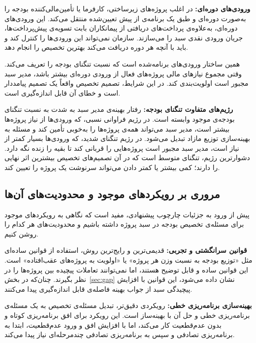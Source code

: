 \textbf{ورودی‌های دوره‌ای:} در اغلب پروژه‌های زیرساختی، کارفرما یا
تأمین‌مالی‌کننده بودجه را به‌صورت دوره‌ای و طبق یک برنامه‌ی از پیش
تعیین‌شده منتقل می‌کند. این ورودی‌های دوره‌ای، به‌علاوه‌ی پرداخت‌های
دریافتی از پیمانکاران بابت تسویه‌ی پیش‌پرداخت‌ها، جریان ورودی
نقدی سبد را می‌سازند. سازمان نمی‌تواند این ورودی‌ها را کنترل کند
و باید با آنچه هر دوره دریافت می‌کند بهترین تخصیص را انجام دهد.

همین ساختار ورودی‌های برنامه‌شده است که نسبت تنگنای بودجه را
تعریف می‌کند. وقتی مجموع نیازهای مالی پروژه‌های فعال از ورودی
دوره‌ای بیشتر باشد، مدیر سبد مجبور است اولویت‌بندی کند. در این
شرایط، تصمیم تخصیص واقعاً یک تصمیم پیامددار است و خطای آن
قابل اندازه‌گیری است.

\textbf{رژیم‌های متفاوت تنگنای بودجه:} رفتار بهینه‌ی مدیر سبد
به شدت به نسبت تنگنای بودجه‌ی موجود وابسته است. در رژیم
فراوانی نسبی، که ورودی‌ها از نیاز پروژه‌ها بیشتر است، مدیر
سبد می‌تواند همه‌ی پروژه‌ها را به‌خوبی تأمین کند و مسئله به
بهینه‌سازی توزیع مازاد تبدیل می‌شود. در رژیم تنگنای شدید،
که ورودی‌ها بسیار کمتر از نیاز است، مدیر سبد مجبور است
پروژه‌هایی را قربانی کند تا بقیه را زنده نگه دارد. دشوارترین
رژیم، تنگنای متوسط است که در آن تصمیم‌های تخصیص بیشترین اثر
نهایی را دارند؛ کمی بیشتر یا کمتر دادن می‌تواند سرنوشت یک
پروژه را تعیین کند.

\subsection{مروری بر رویکردهای موجود و محدودیت‌های آن‌ها}
\label{subsec:existing_approaches}

پیش از ورود به جزئیات چارچوب پیشنهادی، مفید است که نگاهی به
رویکردهای موجود برای مسئله‌ی تخصیص بودجه در سبد پروژه داشته باشیم
و محدودیت‌های هر کدام را روشن کنیم.

\textbf{قوانین سرانگشتی و تجربی:} قدیمی‌ترین و رایج‌ترین روش، استفاده
از قوانین ساده‌ای مثل «توزیع بودجه به نسبت وزن هر پروژه» یا
«اولویت به پروژه‌های عقب‌افتاده» است. این قوانین ساده و قابل
توضیح هستند، اما نمی‌توانند تعاملات پیچیده بین پروژه‌ها را
در نظر بگیرند. چنان‌که در بخش~\ref{sec:gap} نشان داده می‌شود،
این قوانین با افزایش پیچیدگی سبد از جواب بهینه فاصله‌ی
قابل اندازه‌گیری پیدا می‌کنند.

\textbf{بهینه‌سازی برنامه‌ریزی خطی:} رویکردی دقیق‌تر، تبدیل مسئله‌ی
تخصیص به یک مسئله‌ی برنامه‌ریزی خطی و حل آن با بهینه‌ساز است.
این رویکرد برای افق برنامه‌ریزی کوتاه و بدون عدم‌قطعیت کار
می‌کند، اما با افزایش افق و ورود عدم‌قطعیت، ابتدا به برنامه‌ریزی
تصادفی و سپس به برنامه‌ریزی تصادفی چندمرحله‌ای نیاز پیدا می‌کند.

